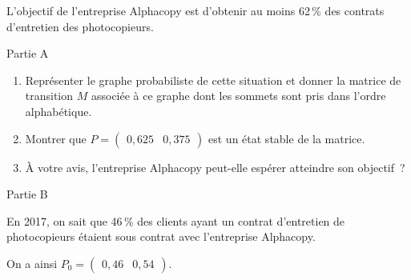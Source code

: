 \par
\smallskip
\par
L'objectif de l'entreprise Alphacopy est d'obtenir au moins 62\,\% des contrats d'entretien des photocopieurs.
\begin{center}\begin{h3}Partie A \end{h3}\end{center}
\begin{enumerate}
     \item Représenter le graphe probabiliste de cette situation et donner la matrice de transition $M$ associée à ce graphe dont les sommets sont pris dans l'ordre alphabétique.
     \item Montrer que $P = \begin{pmatrix} 0,625 & 0,375\end{pmatrix}$ est un état stable de la matrice.
     \item À votre avis, l'entreprise Alphacopy peut-elle espérer atteindre son objectif~?
\end{enumerate}
\begin{center}\begin{h3}Partie B \end{h3}\end{center}
En 2017, on sait que 46\,\% des clients ayant un contrat d'entretien de photocopieurs étaient sous contrat avec l'entreprise Alphacopy.
\par
On a ainsi $P_0=\begin{pmatrix} 0,46 & 0,54\end{pmatrix}$.
